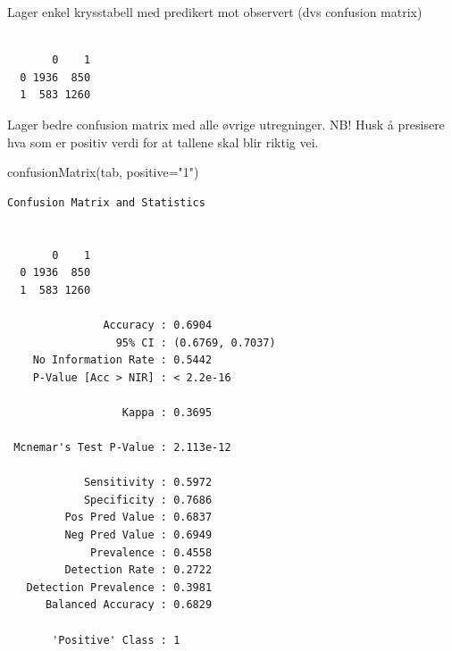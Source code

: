 \documentclass[
  letterpaper,
  DIV=11,
  numbers=noendperiod]{scrreprt}
\newenvironment{Shaded}{\begin{snugshade}}{\end{snugshade}}
\newcommand{\AttributeTok}[1]{\textcolor[rgb]{0.40,0.45,0.13}{#1}}
\newcommand{\FunctionTok}[1]{\textcolor[rgb]{0.28,0.35,0.67}{#1}}
\newcommand{\NormalTok}[1]{\textcolor[rgb]{0.00,0.23,0.31}{#1}}
\newcommand{\OtherTok}[1]{\textcolor[rgb]{0.00,0.23,0.31}{#1}}
\newcommand{\SpecialCharTok}[1]{\textcolor[rgb]{0.37,0.37,0.37}{#1}}
\newcommand{\StringTok}[1]{\textcolor[rgb]{0.13,0.47,0.30}{#1}}
\begin{document}
Lager enkel krysstabell med predikert mot observert (dvs confusion
matrix)

\begin{Shaded}
\end{Shaded}

\begin{verbatim}
   
       0    1
  0 1936  850
  1  583 1260
\end{verbatim}

Lager bedre confusion matrix med alle øvrige utregninger. NB! Husk å
presisere hva som er positiv verdi for at tallene skal blir riktig vei.

\begin{Shaded}
\begin{Highlighting}[]
\FunctionTok{confusionMatrix}\NormalTok{(tab, }\AttributeTok{positive=}\StringTok{"1"}\NormalTok{)}
\end{Highlighting}
\end{Shaded}

\begin{verbatim}
Confusion Matrix and Statistics

   
       0    1
  0 1936  850
  1  583 1260
                                          
               Accuracy : 0.6904          
                 95% CI : (0.6769, 0.7037)
    No Information Rate : 0.5442          
    P-Value [Acc > NIR] : < 2.2e-16       
                                          
                  Kappa : 0.3695          
                                          
 Mcnemar's Test P-Value : 2.113e-12       
                                          
            Sensitivity : 0.5972          
            Specificity : 0.7686          
         Pos Pred Value : 0.6837          
         Neg Pred Value : 0.6949          
             Prevalence : 0.4558          
         Detection Rate : 0.2722          
   Detection Prevalence : 0.3981          
      Balanced Accuracy : 0.6829          
                                          
       'Positive' Class : 1               
                                          
\end{verbatim}
\end{document}
